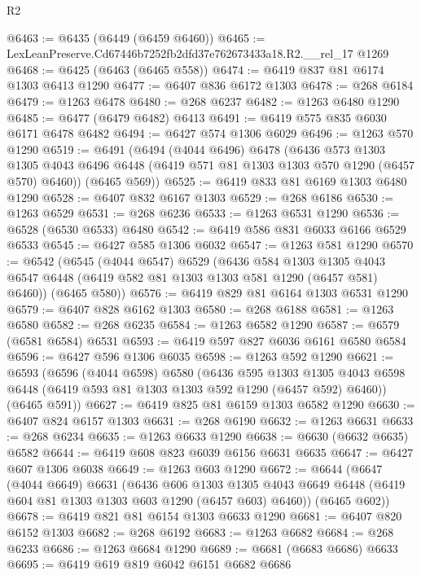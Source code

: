 \begin{lexlean}{R2}
\begin{coremodule}
@6463 := @6435 (@6449 (@6459 @6460))
@6465 := LexLeanPreserve.Cd67446b7252fb2dfd37e762673433a18.R2.__rel_17 @1269
@6468 := @6425 (@6463 (@6465 @558))
@6474 := @6419 @837 @81 @6174 @1303 @6413 @1290
@6477 := @6407 @836 @6172 @1303
@6478 := @268 @6184
@6479 := @1263 @6478
@6480 := @268 @6237
@6482 := @1263 @6480 @1290
@6485 := @6477 (@6479 @6482) @6413
@6491 := @6419 @575 @835 @6030 @6171 @6478 @6482
@6494 := @6427 @574 @1306 @6029
@6496 := @1263 @570 @1290
@6519 := @6491
    (@6494
      (@4044 @6496)
      @6478
      (@6436
        @573
        @1303
        @1305
        @4043
        @6496
        @6448
        (@6419 @571 @81 @1303 @1303 @570 @1290 (@6457 @570) @6460))
      (@6465 @569))
@6525 := @6419 @833 @81 @6169 @1303 @6480 @1290
@6528 := @6407 @832 @6167 @1303
@6529 := @268 @6186
@6530 := @1263 @6529
@6531 := @268 @6236
@6533 := @1263 @6531 @1290
@6536 := @6528 (@6530 @6533) @6480
@6542 := @6419 @586 @831 @6033 @6166 @6529 @6533
@6545 := @6427 @585 @1306 @6032
@6547 := @1263 @581 @1290
@6570 := @6542
    (@6545
      (@4044 @6547)
      @6529
      (@6436
        @584
        @1303
        @1305
        @4043
        @6547
        @6448
        (@6419 @582 @81 @1303 @1303 @581 @1290 (@6457 @581) @6460))
      (@6465 @580))
@6576 := @6419 @829 @81 @6164 @1303 @6531 @1290
@6579 := @6407 @828 @6162 @1303
@6580 := @268 @6188
@6581 := @1263 @6580
@6582 := @268 @6235
@6584 := @1263 @6582 @1290
@6587 := @6579 (@6581 @6584) @6531
@6593 := @6419 @597 @827 @6036 @6161 @6580 @6584
@6596 := @6427 @596 @1306 @6035
@6598 := @1263 @592 @1290
@6621 := @6593
    (@6596
      (@4044 @6598)
      @6580
      (@6436
        @595
        @1303
        @1305
        @4043
        @6598
        @6448
        (@6419 @593 @81 @1303 @1303 @592 @1290 (@6457 @592) @6460))
      (@6465 @591))
@6627 := @6419 @825 @81 @6159 @1303 @6582 @1290
@6630 := @6407 @824 @6157 @1303
@6631 := @268 @6190
@6632 := @1263 @6631
@6633 := @268 @6234
@6635 := @1263 @6633 @1290
@6638 := @6630 (@6632 @6635) @6582
@6644 := @6419 @608 @823 @6039 @6156 @6631 @6635
@6647 := @6427 @607 @1306 @6038
@6649 := @1263 @603 @1290
@6672 := @6644
    (@6647
      (@4044 @6649)
      @6631
      (@6436
        @606
        @1303
        @1305
        @4043
        @6649
        @6448
        (@6419 @604 @81 @1303 @1303 @603 @1290 (@6457 @603) @6460))
      (@6465 @602))
@6678 := @6419 @821 @81 @6154 @1303 @6633 @1290
@6681 := @6407 @820 @6152 @1303
@6682 := @268 @6192
@6683 := @1263 @6682
@6684 := @268 @6233
@6686 := @1263 @6684 @1290
@6689 := @6681 (@6683 @6686) @6633
@6695 := @6419 @619 @819 @6042 @6151 @6682 @6686

\end{coremodule}
\end{lexlean}
